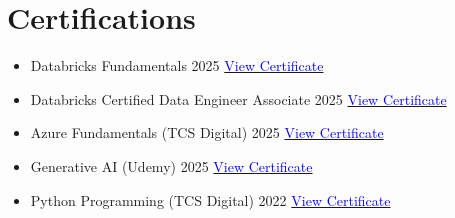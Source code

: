 \documentclass[letterpaper,11pt]{article}
\begin{document}
\section{Certifications}
 \begin{itemize}[leftmargin=0.15in, label={}, itemsep=0pt, parsep=0pt, topsep=0pt]

    \item{Databricks Fundamentals \textbar{} 2025 \hfill
    \href{https://credentials.databricks.com/8e23b34d-2e9a-436b-ad75-4c047c53bf55#acc.ZUbGNQuH}{\textcolor{blue}{View Certificate \faExternalLink}}}
    \item{Databricks Certified Data Engineer Associate \textbar{} 2025 \hfill
    \href{https://credentials.databricks.com/f6801ea1-92fb-4db0-afc8-bb3c42222a37#acc.CinJjBE8}{\textcolor{blue}{View Certificate \faExternalLink}}}
    \item{Azure Fundamentals (TCS Digital) \textbar{} 2025 \hfill
    \href{https://drive.google.com/file/d/1j9oagnlV8IDNerikqXcg9S0tCgJEIu8T/preview}{\textcolor{blue}{View Certificate \faExternalLink}}}
    \item{Generative AI (Udemy) \textbar{} 2025 \hfill
    \href{https://www.udemy.com/certificate/UC-412f4ed7-5ae4-4964-a02b-4944ae58bbbc/}{\textcolor{blue}{View Certificate \faExternalLink}}}
    \item{Python Programming (TCS Digital) \textbar{} 2022 \hfill
    \href{https://drive.google.com/file/d/13DMcNhRNcbFE-joFHZPzwJelQUFm0IBI/preview}{\textcolor{blue}{View Certificate \faExternalLink}}}
    
    
  \end{itemize}


\end{document}
